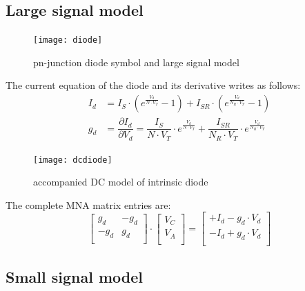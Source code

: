 \documentclass[10pt]{report}
\begin{document}
\addvspace{12pt}

\subsection{Large signal model}

\begin{figure}[ht]
\begin{center}
\texttt{[image: diode]}
\end{center}
\caption{pn-junction diode symbol and large signal model}
\label{fig:diode}
\end{figure}
\FloatBarrier

The current equation of the diode and its derivative writes as
follows:
\begin{align}
I_{d} &= I_{S}\cdot \left(e^{\frac{V_{d}}{N\cdot V_{T}}} - 1\right) + I_{SR}\cdot \left(e^{\frac{V_{d}}{N_R\cdot V_{T}}} - 1\right)\\
g_{d} &= \dfrac{\partial I_{d}}{\partial V_{d}} = \dfrac{I_{S}}{N\cdot V_{T}}\cdot e^{\frac{V_{d}}{N\cdot V_{T}}} + \dfrac{I_{SR}}{N_R\cdot V_{T}}\cdot e^{\frac{V_{d}}{N_R\cdot V_{T}}}
\end{align}

\begin{figure}[ht]
\begin{center}
\texttt{[image: dcdiode]}
\end{center}
\caption{accompanied DC model of intrinsic diode}
\label{fig:dcdiode}
\end{figure}
\FloatBarrier

The complete MNA matrix entries are:
\begin{equation}
\begin{bmatrix}
g_{d} & -g_{d}\\
-g_{d} & g_{d}\\
\end{bmatrix}
\cdot
\begin{bmatrix}
V_{C}\\
V_{A}\\
\end{bmatrix}
=
\begin{bmatrix}
+I_{d} - g_{d}\cdot V_{d}\\
-I_{d} + g_{d}\cdot V_{d}\\
\end{bmatrix}
\end{equation}

\subsection{Small signal model}
\end{document}
